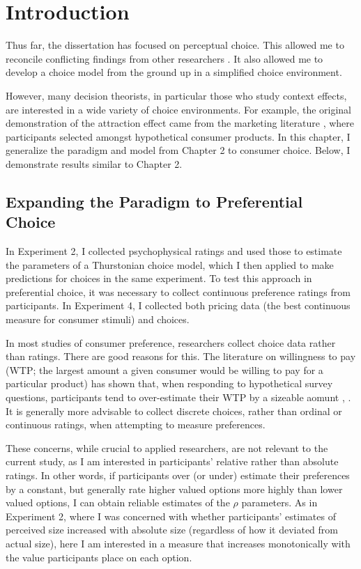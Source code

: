 \section{Introduction}
Thus far, the dissertation has focused on perceptual choice. This allowed me to reconcile conflicting findings from other researchers \parencite{spektorWhenGoodLooks2018b,trueblood2013not}. It also allowed me to develop a choice model from the ground up in a simplified choice environment. 

However, many decision theorists, in particular those who study context effects, are interested in a wide variety of choice environments. For example, the original demonstration of the attraction effect came from the marketing literature \parencite{huberAddingAsymmetricallyDominated1982d}, where participants selected amongst hypothetical consumer products. In this chapter, I generalize the paradigm and model from Chapter 2 to consumer choice. Below, I demonstrate results similar to Chapter 2.

\subsection{Expanding the Paradigm to Preferential Choice}

In Experiment 2, I collected psychophysical ratings and used those to estimate the parameters of a Thurstonian choice model, which I then applied to make predictions for choices in the same experiment. To test this approach in preferential choice, it was necessary to collect continuous preference ratings from participants. In Experiment 4, I collected both pricing data (the best continuous measure for consumer stimuli) and choices.

In most studies of consumer preference, researchers collect choice data rather than ratings. There are good reasons for this. The literature on willingness to pay (WTP; the largest amount a given consumer would be willing to pay for a particular product) has shown that, when responding to hypothetical survey questions, participants tend to over-estimate their WTP by a sizeable aomunt \parencite{breidertREVIEWMETHODSMEASURING2006,schmidtAccuratelyMeasuringWillingness2020}, \parencite[c.f.~]{miller2011should}. It is generally more advisable to collect discrete choices, rather than ordinal or continuous ratings, when attempting to measure preferences.

These concerns, while crucial to applied researchers, are not relevant to the current study, as I am interested in participants' relative rather than absolute ratings. In other words, if participants over (or under) estimate their preferences by a constant, but generally rate higher valued options more highly than lower valued options, I can obtain reliable estimates of the $\rho$ parameters. As in Experiment 2, where I was concerned with whether participants' estimates of perceived size increased with absolute size (regardless of how it deviated from actual size), here I am interested in a measure that increases monotonically with the value participants place on each option. 

